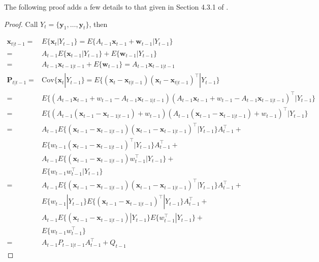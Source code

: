\documentclass[12pt]{article}
\begin{document}
The following proof adds a few details to that given in Section 4.3.1 of
\citet{durbinAndKoopman12}.

\begin{proof}
    Call $Y_t=\{\mathbf{y}_1,\ldots,\mathbf{y}_t\}$, then

    \begin{align}
        \mathbf{x}_{t|t-1}=&E\{\mathbf{x}_t|Y_{t-1}\}=E\{A_{t-1}\mathbf{x}_{t-1}+\mathbf{w}_{t-1}|Y_{t-1}\}\nonumber\\
                          =&A_{t-1}E\{\mathbf{x}_{t-1}|Y_{t-1}\}+E\{\mathbf{w}_{t-1}|Y_{t-1}\}\nonumber\\
                          =&A_{t-1}\mathbf{x}_{t-1|t-1}+E\{\mathbf{w}_{t-1}\}=A_{t-1}\mathbf{x}_{t-1|t-1}\label{eq:p1n1}\\
        \mathbf{P}_{t|t-1}=&\text{Cov}\{\mathbf{x}_t|Y_{t-1}\}=E\{(\mathbf{x}_t-\mathbf{x}_{t|t-1})(\mathbf{x}_t-\mathbf{x}_{t|t-1})^\intercal|Y_{t-1}\}\nonumber\\
                          =&E\{\left(A_{t-1}\mathbf{x}_{t-1}+w_{t-1}-A_{t-1}\mathbf{x}_{t-1|t-1}\right)\left(A_{t-1}\mathbf{x}_{t-1}+w_{t-1}-A_{t-1}\mathbf{x}_{t-1|t-1}\right)^\intercal|Y_{t-1}\}\nonumber\\
                          =&E\{\left(A_{t-1}(\mathbf{x}_{t-1}-\mathbf{x}_{t-1|t-1})+w_{t-1}\right)\left(A_{t-1}(\mathbf{x}_{t-1}-\mathbf{x}_{t-1|t-1})+w_{t-1}\right)^\intercal|Y_{t-1}\}\nonumber\\
                          =&A_{t-1}E\{(\mathbf{x}_{t-1}-\mathbf{x}_{t-1|t-1})(\mathbf{x}_{t-1}-\mathbf{x}_{t-1|t-1})^\intercal|Y_{t-1}\}A_{t-1}^\intercal+\nonumber\\
                           &E\{w_{t-1}(\mathbf{x}_{t-1}-\mathbf{x}_{t-1|t-1})^\intercal|Y_{t-1}\}A_{t-1}^\intercal+\nonumber\\
                           &A_{t-1}E\{(\mathbf{x}_{t-1}-\mathbf{x}_{t-1|t-1})w_{t-1}^\intercal|Y_{t-1}\}+\nonumber\\
                           &E\{w_{t-1}w_{t-1}^\intercal|Y_{t-1}\}\nonumber\\
                          =&A_{t-1}E\{(\mathbf{x}_{t-1}-\mathbf{x}_{t-1|t-1})(\mathbf{x}_{t-1}-\mathbf{x}_{t-1|t-1})^\intercal|Y_{t-1}\}A_{t-1}^\intercal+\nonumber\\
                           &E\{w_{t-1}|Y_{t-1}\}E\{(\mathbf{x}_{t-1}-\mathbf{x}_{t-1|t-1})^\intercal|Y_{t-1}\}A_{t-1}^\intercal+\nonumber\\
                           &A_{t-1}E\{(\mathbf{x}_{t-1}-\mathbf{x}_{t-1|t-1})|Y_{t-1}\}E\{w_{t-1}^\intercal|Y_{t-1}\}+\nonumber\\
                           &E\{w_{t-1}w_{t-1}^\intercal\}\label{eq:p1n2}\\
                          =&A_{t-1}P_{t-1|t-1}A_{t-1}^\intercal+Q_{t-1}\label{eq:p1n3}
    \end{align}


\end{proof}
\end{document}

